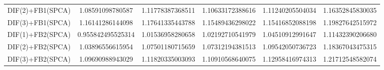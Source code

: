 \begin{table}[htb]
\begin{adjustbox}{totalheight=\baselineskip}
\begin{tabular}{lSSSSS}
DIF(2)+FB1(SPCA) & 1.08591098780587 & 1.11778387368511 & 1.10633172388616 & 1.11240205504034 & 1.16352845830035 \\ 
DIF(3)+FB1(SPCA) & 1.16141286144098 & 1.17641335443788 & 1.15489436298022 & 1.15416852088198 & 1.19827642515972 \\ 
DIF(1)+FB2(SPCA) & 0.955842495525314 & 1.01536958280658 & 1.02192710541979 & 1.04510912991647 & 1.11432390206680 \\ 
DIF(2)+FB2(SPCA) & 1.03896556615954 & 1.07501180715659 & 1.07312194381513 & 1.09542050736723 & 1.18367043475315 \\ 
DIF(3)+FB2(SPCA) & 1.09690988943029 & 1.11820335003093 & 1.10910568640075 & 1.12958416974313 & 1.21712548582074 \\ \bottomrule 
\end{tabular}
\end{adjustbox}
\end{table}



